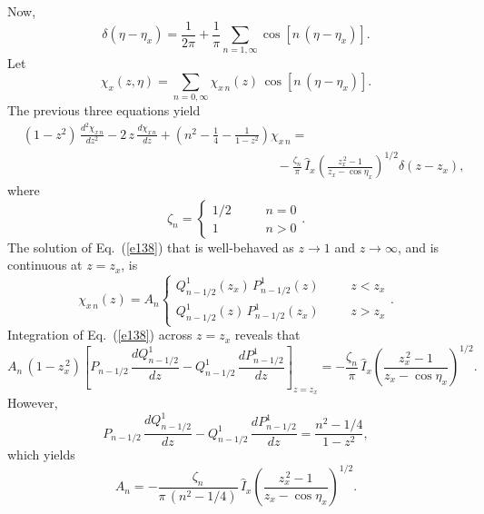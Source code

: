 \documentclass[12pt,prb,aps]{revtex4-1}
\begin{document}
Now,\,\cite{jack}
\begin{equation}
\delta(\eta-\eta_x) = \frac{1}{2\pi} + \frac{1}{\pi}\sum_{n=1,\infty}\cos[n\,(\eta-\eta_x)].
\end{equation}
Let
\begin{equation}
\chi_x(z,\eta) = \sum_{n=0,\infty}\chi_{x\,n}(z)\,\cos[n\,(\eta-\eta_x)].
\end{equation}
The previous three equations yield
\begin{align}\label{e138}
&(1-z^{2})\,\frac{d^2\chi_{x\,n}}{d z^{2}}-2\,z\,\frac{d\chi_{x\,n}}{dz}+\left(n^{2}-\frac{1}{4}-\frac{1}{1-z^{2}}\right)\chi_{x\,n}
 =\nonumber\\[0.5ex]
&\phantom{===============}- \frac{\zeta_n}{\pi}\,\hat{I}_x\left(\frac{z_x^{\,2}-1}{z_x-\cos\eta_x}\right)^{1/2}\delta(z-z_x),
\end{align}
where
\begin{equation}
\zeta_n =\left\{\begin{array}{ccc}1/2&~~~~~&n=0\\[0.5ex]
1&&n>0\end{array}\right..
\end{equation}
The solution of Eq.~(\ref{e138}) that is well-behaved as $z\rightarrow 1$ and $z\rightarrow\infty$, and is continuous at $z=z_x$, is\,\cite{abram,abrama}
\begin{equation}
\chi_{x\,n}(z) = A_n\left\{\begin{array}{ccc} Q_{n-1/2}^1(z_x)\,P_{n-1/2}^1(z)&~~~~&z<z_x\\[0.5ex]
 Q_{n-1/2}^1(z)\,P_{n-1/2}^1(z_x)&&z>z_x\end{array}\right..
\end{equation}
Integration of Eq.~(\ref{e138}) across $z=z_x$ reveals that
\begin{equation}
A_n\,(1-z_x^{\,2})\left[P_{n-1/2}\,\frac{dQ_{n-1/2}^1}{dz} - Q_{n-1/2}^1\,\frac{dP_{n-1/2}^1}{dz}\right]_{z=z_x}= -\frac{\zeta_n}{\pi}\,\hat{I}_x\left(\frac{z_x^{\,2}-1}{z_x-\cos\eta_x}\right)^{1/2}.
\end{equation}
However,\,\cite{morsey}
\begin{equation}
P_{n-1/2}\,\frac{dQ_{n-1/2}^1}{dz} - Q_{n-1/2}^1\,\frac{dP_{n-1/2}^1}{dz}= \frac{n^{2}-1/4}{1-z^{2}},
\end{equation}
which yields 
\begin{equation}
A_n = -\frac{\zeta_n}{\pi\,(n^{2}-1/4)}\,\hat{I}_x\left(\frac{z_x^{\,2}-1}{z_x-\cos\eta_x}\right)^{1/2}.
\end{equation}
\end{document}
